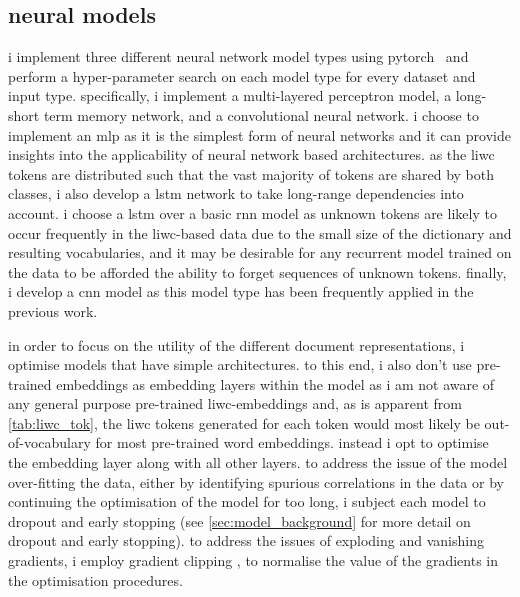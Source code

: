 \subsection{neural models}\label{sec:redux_neural}
i implement three different neural network model types using pytorch~\citep{paszke:2019} and perform a hyper-parameter search on each model type for every dataset and input type. 
specifically, i implement a multi-layered perceptron model, a long-short term memory network, and a convolutional neural network.
i choose to implement an mlp as it is the simplest form of neural networks and it can provide insights into the applicability of neural network based architectures.
as the liwc tokens are distributed such that the vast majority of tokens are shared by both classes, i also develop a lstm network to take long-range dependencies into account.
i choose a lstm over a basic rnn model as unknown tokens are likely to occur frequently in the liwc-based data due to the small size of the dictionary and resulting vocabularies, and it may be desirable for any recurrent model trained on the data to be afforded the ability to forget sequences of unknown tokens.
finally, i develop a cnn model as this model type has been frequently applied in the previous work.

in order to focus on the utility of the different document representations, i optimise models that have simple architectures. 
to this end, i also don't use pre-trained embeddings as embedding layers within the model as i am not aware of any general purpose pre-trained liwc-embeddings and, as is apparent from \cref{tab:liwc_tok}, the liwc tokens generated for each token would most likely be out-of-vocabulary for most pre-trained word embeddings.
instead i opt to optimise the embedding layer along with all other layers.
to address the issue of the model over-fitting the data, either by identifying spurious correlations in the data or by continuing the optimisation of the model for too long, i subject each model to dropout and early stopping (see \cref{sec:model_background} for more detail on dropout and early stopping).
to address the issues of exploding and vanishing gradients, i employ gradient clipping \citep{bengio:1994}, to normalise the value of the gradients in the optimisation procedures.

